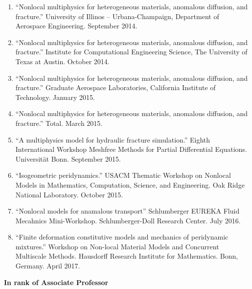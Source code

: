 \begin{enumerate}[resume]
    \item ``Nonlocal multiphysics for heterogeneous materials, anomalous diffusion, and fracture.'' University of Illinos -- Urbana-Champaign, Department of Aerospace Engineering. September 2014.
    \item ``Nonlocal multiphysics for heterogeneous materials, anomalous diffusion, and fracture.'' Institute for Computational Engineering Science, The University of Texas at Austin. October 2014.
    \item ``Nonlocal multiphysics for heterogeneous materials, anomalous diffusion, and fracture.'' Graduate Aerospace Laboratories, California Institute of Technology. January 2015.
    \item ``Nonlocal multiphysics for heterogeneous materials, anomalous diffusion, and fracture.'' Total. March 2015.
    \item ``A multiphysics model for hydraulic fracture simulation.''  Eighth International Workshop Meshfree Methods for Partial Differential Equations. Universit\"{a}t Bonn. September 2015.
    \item ``Isogeometric peridynamics.'' USACM Thematic Workshop on Nonlocal Models in Mathematics, Computation, Science, and Engineering.  Oak Ridge National Laboratory. October 2015.
    \item ``Nonlocal models for anamalous transport'' Schlumberger EUREKA Fluid Mecahnics Mini-Workshop. Schlumberger-Doll Research Center. July 2016.
    \item ``Finite deformation constitutive models and mechanics of peridynamic mixtures.'' Workshop on Non-local Material Models and Concurrent Multiscale Methods. Hausdorff Research Institute for Mathematics.  Bonn, Germany.  April 2017.
\end{enumerate}
    \textbf{In rank of Associate Professor}
